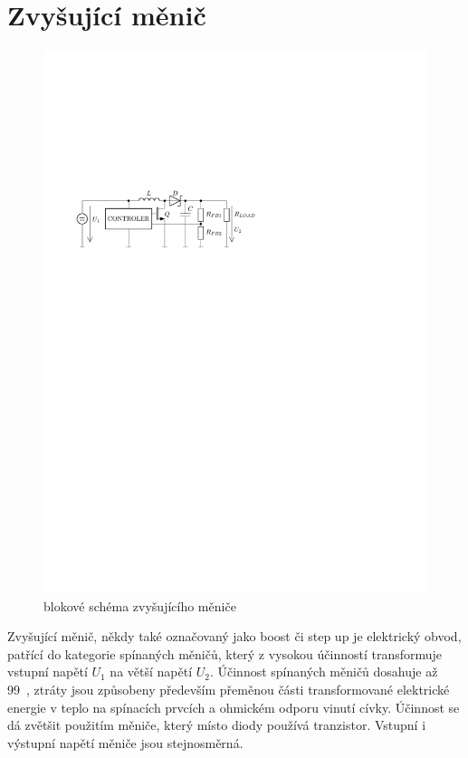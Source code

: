 \section{Zvyšující měnič}
\begin{figure}[H]
    \begin{center}
        \includegraphics[width=\textwidth]{img/boost}
    \end{center}
    \caption{blokové schéma zvyšujícího měniče}
\end{figure}
Zvyšující měnič, někdy také označovaný jako boost či step up je elektrický obvod, patřící do kategorie spínaných měničů, který z vysokou účinností transformuje vstupní napětí $U_1$ na větší napětí $U_2$. Účinnost spínaných měničů dosahuje až 99~\jedn{\%}, ztráty jsou způsobeny především přeměnou části transformované elektrické energie v teplo na spínacích prvcích a ohmickém odporu vinutí cívky. Účinnost se dá zvětšit použitím měniče, který místo diody používá tranzistor. Vstupní i výstupní napětí měniče jsou stejnosměrná.

